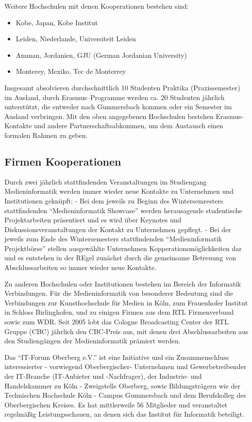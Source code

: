 Weitere Hochschulen mit denen Kooperationen bestehen sind:

\begin{itemize}
\tightlist
\item
  Kobe, Japan, Kobe Institut
\item
  Leiden, Niederlande, Universiteit Leiden
\item
  Amman, Jordanien, GJU (German Jordanian University)
\item
  Monterey, Mexiko, Tec de Monterrey
\end{itemize}

Insgesamt absolvieren durchschnittlich 10 Studenten Praktika
(Praxissemester) im Ausland, durch Erasmus--Programme werden ca. 20
Studenten jährlich unterstützt, die entweder nach Gummersbach kommen
oder ein Semester im Ausland verbringen. Mit den oben angegebenen
Hochschulen bestehen Erasmus-Kontakte und andere Partnerschaftsabkommen,
um dem Austausch einen formalen Rahmen zu geben.

\subsection{Firmen Kooperationen}\label{firmen-kooperationen}

Durch zwei jährlich stattfindenden Veranstaltungen im Studiengang
Medieninformatik werden immer wieder neue Kontakte zu Unternehmen und
Institutionen geknüpft: - Bei dem jeweils zu Beginn des Wintersemresters
stattfindenden ``Medieninformatik Showcase'' werden herausagende
studentische Projektarbeiten präsentiert und es wird über Keynotes und
Diskussionsveranstaltungen der Kontakt zu Unternehmen gepflegt. - Bei
der jeweils zum Ende des Wintersemesters stattfindenden
``Medieninformatik Projektbörse'' stellen ausgewählte Unternehmen
Kopperationsmöglichkeiten dar und es entstehen in der REgel zunächst
durch die gemeinsame Betreuung von Abschlussarbeiten so immer wieder
neue Kontakte.

Zu anderen Hochschulen oder Institutionen bestehen im Bereich der
Informatik Verbindungen. Für die Medieninformatik von besonderer
Bedeutung sind die Verbindungen zur Kunsthochschule für Medien in Köln,
zum Frauenhofer Institut in Schloss Birlinghofen, und zu einigen Firmen
aus dem RTL Firmenverbund sowie zum WDR. Seit 2005 lobt das Cologne
Broadcasting Center der RTL Gruppe (CBC) jährlich den CBC-Preis aus, mit
denen drei Abschlussarbeiten aus den Studiengängen der Medieninformatik
prämiert werden.

Das ``IT-Forum Oberberg e.V.'' ist eine Initiative und ein
Zusammenschluss interessierter - vorwiegend Oberbergischer- Unternehmen
und Gewerbetreibender der IT-Branche (IT-Anbieter und -Nachfrager), der
Industrie- und Handelskammer zu Köln - Zweigstelle Oberberg, sowie
Bildungsträgern wie der Technischen Hochschule Köln - Campus Gummersbach
und dem Berufskolleg des Oberbergischen Kreises. Es hat mittlerweile 56
Mitglieder und veranstaltet regelmäßig Leistungsschauen, an denen sich
das Institut für Informatik beteiligt.

